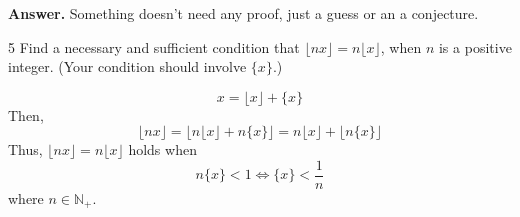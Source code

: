 \documentclass[a4paper,12pt]{article}
\makeatletter
\newtheorem*{solution}{Solution}
\theoremstyle{definition}
\renewenvironment{solution}[1][Solution] {\par\pushQED{\qed}\normalfont\topsep6\p@\@plus6\p@\relax\trivlist\item[\hskip\labelsep\bfseries#1\@addpunct{.}]\ignorespaces}{\popQED\endtrivlist\@endpefalse} \makeatother
\newenvironment{problems}{\begin{list}{}{\renewcommand{\makelabel}[1]{\textbf{##1}\hfil}}}{\end{list}}
\makeatother
\begin{document}
\begin{problems}
    \textbf{Answer.} Something doesn't need any proof, just a guess or an a conjecture.
    \item[5]  Find a necessary and sufficient condition that $\lfloor nx\rfloor=n\lfloor x\rfloor$, when $n$ is a positive integer.  (Your condition should involve $\{x\}$.)
    \begin{solution}
        \begin{equation*}
            x = \lfloor x\rfloor + \{x\}
        \end{equation*}
        Then,
        \begin{equation*}
            \lfloor nx \rfloor = \lfloor n\lfloor x\rfloor +n\{x\}\rfloor = n\lfloor x \rfloor + \lfloor n\{x\}\rfloor
        \end{equation*}
        Thus, $\lfloor nx \rfloor =n\lfloor x\rfloor$ holds when
        \begin{equation*}
            n\{x\}<1 \Leftrightarrow \{x\}<\frac{1}{n}
        \end{equation*}
        where $n\in \mathbb{N}_+$.
    \end{solution} 
\end{problems}
\end{document}
